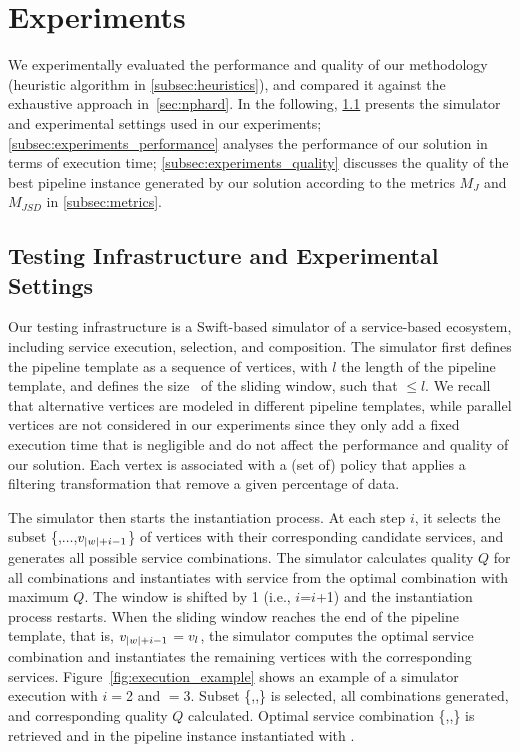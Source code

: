 \section{Experiments}\label{sec:experiment}
We experimentally evaluated the performance and quality of our methodology (heuristic algorithm in \cref{subsec:heuristics}), and compared it against the exhaustive approach in~\cref{sec:nphard}. In the following,
\cref{subsec:experiments_infrastructure} presents the simulator and experimental settings used in our experiments;
\cref{subsec:experiments_performance} analyses the performance of our solution in terms of execution time; \cref{subsec:experiments_quality} discusses the quality of the best pipeline instance generated by our solution according to the metrics $M_J$ and $M_{JSD}$ in \cref{subsec:metrics}.

\subsection{Testing Infrastructure and Experimental Settings}\label{subsec:experiments_infrastructure}
Our testing infrastructure is a Swift-based simulator of a service-based ecosystem, including service execution, selection, and composition.
The simulator first defines the pipeline template as a sequence of vertices, with $l$ the length of the pipeline template, and defines the size \windowsize\ of the sliding window, such that \windowsize$\leq$$l$.
    We recall that alternative vertices are modeled in different pipeline templates, while parallel vertices are not considered in our experiments since they only add a fixed execution time that is negligible and do not affect the performance and quality of our solution.
    Each vertex is associated with a (set of) policy that applies a filtering transformation that remove a given percentage of data.

    The simulator then starts the instantiation process.
    At each step $i$, it selects the subset \{,$\ldots$,$v_{|w|+i-1}$\} of vertices with their corresponding candidate services, and generates all possible service combinations.
    The simulator calculates quality $Q$ for all combinations and instantiates  with service  from the optimal combination with maximum $Q$.
    The window is shifted by 1 (i.e., $i$=$i$+1) and the instantiation process restarts.
    When the sliding window reaches the end of the pipeline template, that is, $v_{|w|+i-1}$$=$$v_{l}$, the simulator computes the optimal service combination and instantiates the remaining vertices with the corresponding services.
    Figure~\ref{fig:execution_example} shows an example of a simulator execution with $i$$=$2 and \windowsize$=$3. Subset \{,,\} is selected, all combinations generated, and corresponding quality $Q$ calculated.
  Optimal service combination \{,,\} is retrieved and  in the pipeline instance instantiated with .

